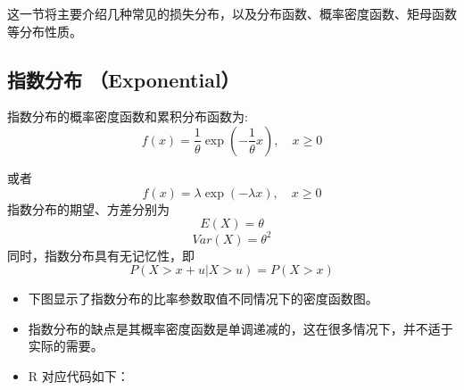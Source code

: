\documentclass[
]{book}
\begin{document}
这一节将主要介绍几种常见的损失分布，以及分布函数、概率密度函数、矩母函数等分布性质。

\hypertarget{ux6307ux6570ux5206ux5e03-exponential}{%
\subsection{指数分布 （Exponential）}\label{ux6307ux6570ux5206ux5e03-exponential}}

指数分布的概率密度函数和累积分布函数为:
\[
f(x)=\frac{1}{\theta}\exp\left({-\frac{1}{\theta}x}\right),\quad x \ge 0
\]

或者
\[
f(x)=\lambda\exp\left({-\lambda x}\right),\quad x \ge 0
\]
指数分布的期望、方差分别为 \[E(X)=\theta\] \[Var(X)=\theta^2\] 同时，指数分布具有无记忆性，即 \[P(X>x+u|X>u)=P(X>x)\]

\begin{itemize}
\item
  下图显示了指数分布的比率参数取值不同情况下的密度函数图。
\item
  指数分布的缺点是其概率密度函数是单调递减的，这在很多情况下，并不适于实际的需要。
\item
  R 对应代码如下：
\end{itemize}
\end{document}
